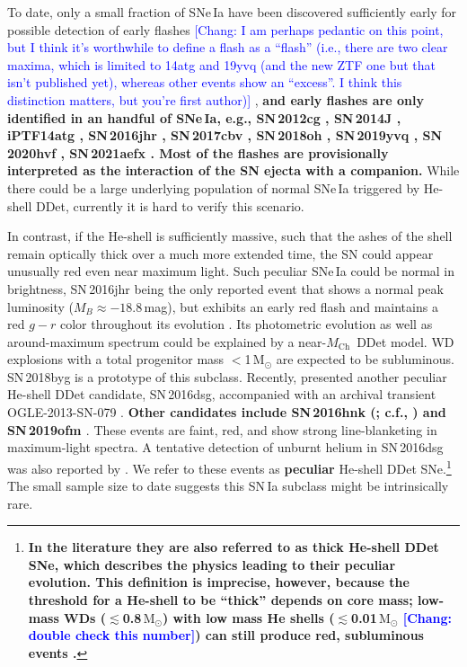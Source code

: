 \documentclass[twocolumn]{aastex631}
\newcommand{\Mch}{$M_\mathrm{Ch}$}
\newcommand{\Msun}{\mathrm{M_\odot}}
\newcommand{\chang}[1]{\textcolor{blue}{[Chang: #1]}}
\newcommand{\revise}[1]{\textbf{#1}}
\begin{document}
To date, only a small fraction of SNe\,Ia have been discovered sufficiently early for possible detection of early flashes \chang{I am perhaps pedantic on this point, but I think it's worthwhile to define a flash as a ``flash'' (i.e., there are two clear maxima, which is limited to 14atg and 19yvq (and the new ZTF one but that isn't published yet), whereas other events show an ``excess''. I think this distinction matters, but you're first author)} \citep[e.g.,][]{Deckers_2022}, \revise{and early flashes are only identified in an handful of SNe\,Ia, e.g., SN\,2012cg \citep{Marion_12cg_2016}, SN\,2014J \citep{Goobar_2014J_2015}, iPTF14atg \citep{Cao_2015}, SN\,2016jhr \citep{jiang_16jhr_2017}, SN\,2017cbv \citep{Hosseinzadeh_17cbv_2017}, SN\,2018oh \citep{Dimitriadis_18oh_2019}, SN\,2019yvq \citep{Miller_2020}, SN\,2020hvf \citep{Jiang_20hvf_2021}, SN\,2021aefx \citep{Ashall_21aefx_2022, Hosseinzadeh_21aefx_2022}. Most of the flashes are provisionally interpreted as the interaction of the SN ejecta with a companion.} While there could be a large underlying population of normal SNe\,Ia triggered by He-shell DDet, currently it is hard to verify this scenario. 

In contrast, if the He-shell is sufficiently massive, such that the ashes of the shell remain optically thick over a much more extended time, the SN could appear unusually red even near maximum light. Such peculiar SNe\,Ia could be normal in brightness, SN\,2016jhr being the only reported event that shows a normal peak luminosity ($M_B\approx-18.8$\,mag), but exhibits an early red flash and maintains a red $g-r$ color throughout its evolution \citep{jiang_16jhr_2017}. Its photometric evolution as well as around-maximum spectrum could be explained by a near-\Mch\ DDet model. %
WD explosions with a total progenitor mass $<$1\,$\mathrm{M_\odot}$ are expected to be subluminous. SN\,2018byg \citep{de_18byg_2019} is a prototype of this subclass. Recently, \citet{Dong_16dsg_2022} presented another peculiar He-shell DDet candidate, SN\,2016dsg, accompanied with an archival transient OGLE-2013-SN-079 \citep{Inserra_OGLE13_079_2015}. \revise{Other candidates include SN\,2016hnk (\citealp{jacobson-galan_16hnk_2020}; c.f., \citealp{galbany_16hnk_2019}) and SN\,2019ofm \citep{de_Ca_rich_2020}}. These events are faint, red, and show strong line-blanketing in maximum-light spectra. A tentative detection of unburnt helium in SN\,2016dsg was also reported by \citet{Dong_16dsg_2022}. We refer to these events as \revise{peculiar} He-shell DDet SNe.\footnote{\revise{In the literature they are also referred to as thick He-shell DDet SNe, which describes the physics leading to their peculiar evolution. This definition is imprecise, however, because the threshold for a He-shell to be ``thick'' depends on core mass; low-mass WDs ($\lesssim$0.8\,$\Msun$) with low mass He shells ($\lesssim$0.01\,$\Msun$ \chang{double check this number}) can still produce red, subluminous events \citep[e.g.,][]{Shen_2D_2021}.}}
The small sample size to date suggests this SN\,Ia subclass might be intrinsically rare.
\end{document}
